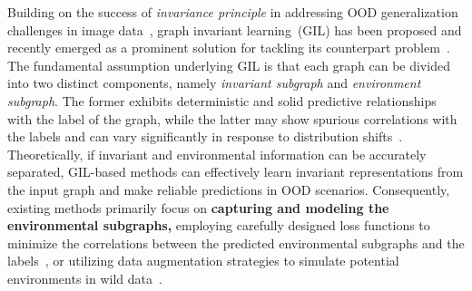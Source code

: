 {Building on the success of \textit{invariance principle} in addressing OOD generalization challenges in image data~\citep{creager2021environment,ye2022ood}, graph invariant learning~(GIL) has been proposed and recently emerged as a prominent solution for tackling its counterpart problem~\citep{li2022learning,fan2022debiasing,miao2022interpretable,wu2022discovering}.} The fundamental assumption underlying GIL is that each graph can be divided into two distinct components, namely \textit{invariant subgraph} and \textit{environment subgraph}. The former exhibits deterministic and solid predictive relationships with the label of the graph, while the latter may show spurious correlations with the labels and can vary significantly in response to distribution shifts~\citep{yang2022learning,chen2024does}. 
Theoretically, if invariant and environmental information can be accurately separated, GIL-based methods can effectively learn invariant representations from the input graph and make reliable predictions in OOD scenarios. Consequently, existing methods primarily focus on \textbf{capturing and modeling the environmental subgraphs,} employing carefully designed loss functions to minimize the correlations between the predicted environmental subgraphs and the labels~\citep{gui2024joint,piao2024improving}, or utilizing data augmentation strategies to simulate potential environments in wild data~\citep{wu2022handling,jia2024graph}.

